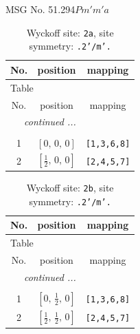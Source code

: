 \documentclass[fleqn,8pt]{jsarticle}
\begin{document}
\setcounter{MaxMatrixCols}{32}

\renewcommand{\tablename}{Table~}
\renewcommand{\figurename}{Figure~}
\begin{center}
\LARGE
MSG No. 51.294\quad$Pm'm'a$
\end{center}
\renewcommand{\arraystretch}{1.2}
\begin{longtable}{ccc}
\caption{Wyckoff site: {\tt 2a}, site symmetry: {\tt .2'/m'.}}
 \\
 \hline \hline
No. & position & mapping \\ \hline \endfirsthead

\multicolumn{2}{l}{\tablename\ \thetable{}} \\
 \hline \hline
No. & position & mapping \\ \hline \endhead

 \hline \hline
\multicolumn{2}{r}{\footnotesize\it continued ...} \\ \endfoot

 \hline \hline
\multicolumn{2}{r}{} \\ \endlastfoot

1 & $\left[ 0,\, 0,\, 0 \right]$ & {\tt [1,3,6,8]} \\ \hline
2 & $\left[ \frac{1}{2},\, 0,\, 0 \right]$ & {\tt [2,4,5,7]} \\
\end{longtable}
\renewcommand{\arraystretch}{1.2}
\begin{longtable}{ccc}
\caption{Wyckoff site: {\tt 2b}, site symmetry: {\tt .2'/m'.}}
 \\
 \hline \hline
No. & position & mapping \\ \hline \endfirsthead

\multicolumn{2}{l}{\tablename\ \thetable{}} \\
 \hline \hline
No. & position & mapping \\ \hline \endhead

 \hline \hline
\multicolumn{2}{r}{\footnotesize\it continued ...} \\ \endfoot

 \hline \hline
\multicolumn{2}{r}{} \\ \endlastfoot

1 & $\left[ 0,\, \frac{1}{2},\, 0 \right]$ & {\tt [1,3,6,8]} \\ \hline
2 & $\left[ \frac{1}{2},\, \frac{1}{2},\, 0 \right]$ & {\tt [2,4,5,7]} \\
\end{longtable}
\renewcommand{\arraystretch}{1.2}
\end{document}
